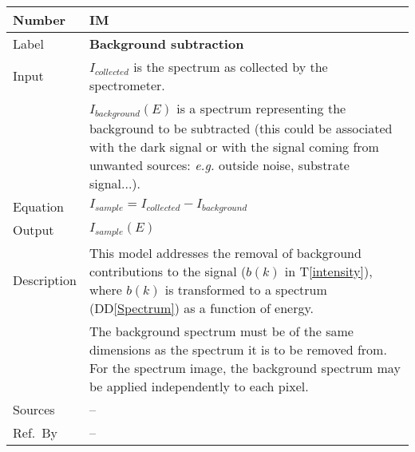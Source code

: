 \documentclass[12pt]{article}
\newcommand{\colAwidth}{0.13\textwidth}
\newcommand{\colBwidth}{0.82\textwidth}
\newcommand{\ddref}[1]{DD\ref{#1}}
\newcommand{\tref}[1]{T\ref{#1}}
\newcounter{instnum} %
\begin{document}
~\newline


\noindent
\begin{minipage}{\textwidth}
	\renewcommand*{\arraystretch}{1.5}
	\begin{tabular}{| p{\colAwidth} | p{\colBwidth}|}
		\hline
		\rowcolor[gray]{0.9}
		Number& IM{instnum}\theinstnum \label{background}\\
		\hline
		Label& \bf Background subtraction\\
		\hline
		Input & $I_{collected}$ is the spectrum as collected by the spectrometer.\\
		& $I_{background}(E)$ is a spectrum representing the background to be
subtracted (this could be associated with the dark signal or with the signal
coming from unwanted sources: \textit{e.g.} outside noise, substrate
signal...).\\
		\hline
		Equation & $I_{sample}=I_{collected}-I_{background}$\\
		\hline
		Output& $I_{sample}(E)$\\
		\hline
		Description & This model addresses the removal of background contributions to
the signal ($b(k)$ in \tref{intensity}), where $b(k)$ is transformed to a
spectrum (\ddref{Spectrum}) as a function of energy.\\
		& The background spectrum must be of the same dimensions as the spectrum it is
to be removed from. For the spectrum image, the background spectrum may be
applied independently to each pixel.\\
		\hline
		Sources & -- \\
		\hline
		Ref.\ By & --\\
		\hline
	\end{tabular}
\end{minipage}\\

~\newline

\end{document}
